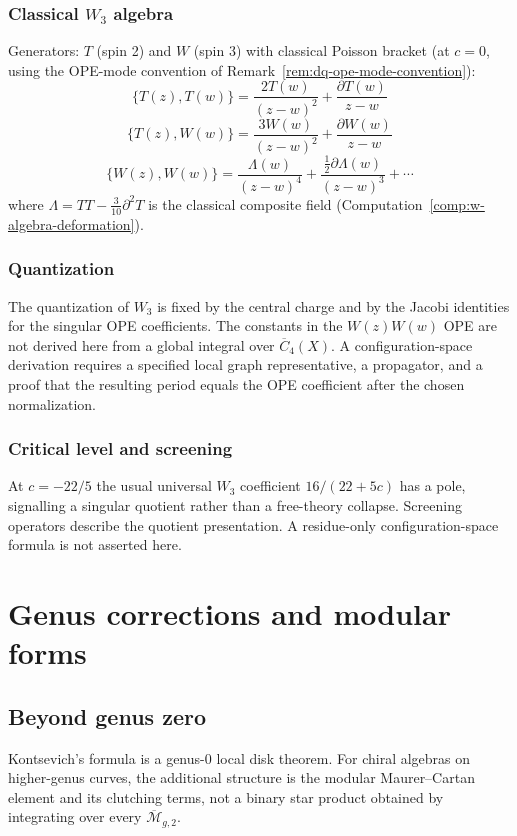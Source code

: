 \subsubsection{\texorpdfstring{Classical $W_3$ algebra}{Classical W-3 algebra}}

Generators: $T$ (spin 2) and $W$ (spin 3) with classical Poisson bracket
(at $c = 0$, using the OPE-mode convention of
Remark~\ref{rem:dq-ope-mode-convention}):
\[\{T(z), T(w)\} = \frac{2T(w)}{(z-w)^2} + \frac{\partial T(w)}{z-w}\]
\[\{T(z), W(w)\} = \frac{3W(w)}{(z-w)^2} + \frac{\partial W(w)}{z-w}\]
\[\{W(z), W(w)\} = \frac{\Lambda(w)}{(z-w)^4} + \frac{\tfrac{1}{2}\partial\Lambda(w)}{(z-w)^3} + \cdots\]
where $\Lambda = TT - \tfrac{3}{10}\partial^2 T$ is the classical
composite field (Computation~\ref{comp:w-algebra-deformation}).

\subsubsection{Quantization}

The quantization of $W_3$ is fixed by the central charge and by the
Jacobi identities for the singular OPE coefficients. The constants in
the $W(z)W(w)$ OPE are not derived here from a global integral over
\(\overline{C}_4(X)\). A configuration-space derivation requires a
specified local graph representative, a propagator, and a proof that
the resulting period equals the OPE coefficient after the chosen
normalization.

\subsubsection{Critical level and screening}

At $c=-22/5$ the usual universal $W_3$ coefficient
$16/(22+5c)$ has a pole, signalling a singular quotient rather than a
free-theory collapse. Screening operators describe the quotient
presentation. A residue-only configuration-space formula is not
asserted here.

\section{Genus corrections and modular forms}

\subsection{Beyond genus zero}

Kontsevich's formula is a genus-$0$ local disk theorem. For chiral
algebras on higher-genus curves, the additional structure is the
modular Maurer--Cartan element and its clutching terms, not a binary
star product obtained by integrating over every $\overline{\mathcal
M}_{g,2}$.

